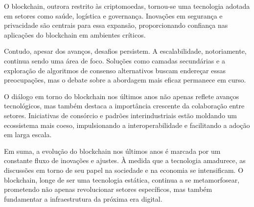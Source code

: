 O blockchain, outrora restrito às criptomoedas, tornou-se uma tecnologia adotada em setores como saúde, logística e governança. Inovações em segurança e privacidade são centrais para essa expansão, proporcionando confiança nas aplicações do blockchain em ambientes críticos.

Contudo, apesar dos avanços, desafios persistem. A escalabilidade, notoriamente, continua sendo uma área de foco. Soluções como camadas secundárias e a exploração de algoritmos de consenso alternativos buscam endereçar essas preocupações, mas o debate sobre a abordagem mais eficaz permanece em curso.

O diálogo em torno do blockchain nos últimos anos não apenas reflete avanços tecnológicos, mas também destaca a importância crescente da colaboração entre setores. Iniciativas de consórcio e padrões interindustriais estão moldando um ecossistema mais coeso, impulsionando a interoperabilidade e facilitando a adoção em larga escala.

Em suma, a evolução do blockchain nos últimos anos é marcada por um constante fluxo de inovações e ajustes. À medida que a tecnologia amadurece, as discussões em torno de seu papel na sociedade e na economia se intensificam. O blockchain, longe de ser uma tecnologia estática, continua a se metamorfosear, prometendo não apenas revolucionar setores específicos, mas também fundamentar a infraestrutura da próxima era digital.